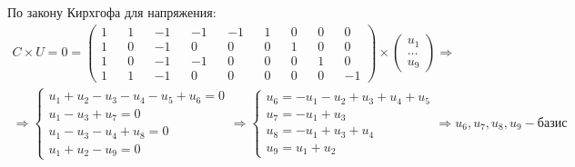 \documentclass{article}
\begin{document}
По закону Кирхгофа для напряжения:
\begin{align*}
    C \times U = 0 = 
    \begin{pmatrix}
        1 && 1 && -1 && -1 && -1 && 1 && 0 && 0 &&  0 \\
        1 && 0 && -1 &&  0 &&  0 && 0 && 1 && 0 &&  0 \\
        1 && 0 && -1 && -1 &&  0 && 0 && 0 && 1 &&  0 \\
        1 && 1 && -1 &&  0 &&  0 && 0 && 0 && 0 && -1
    \end{pmatrix}
    \times
    \begin{pmatrix}
        u_1 \\ \dots \\ u_9
    \end{pmatrix}
    \Longrightarrow \\
    \Longrightarrow
    \begin{cases}
        u_1 + u_2 - u_3 - u_4 - u_5 + u_6 = 0 \\
        u_1 - u_3 + u_7 = 0 \\
        u_1 - u_3 - u_4 + u_8 = 0 \\
        u_1 + u_2 - u_9 = 0
    \end{cases}
    \Longrightarrow
    \begin{cases}
        u_6 = -u_1 - u_2 + u_3 + u_4 + u_5 \\
        u_7 = -u_1 + u_3 \\
        u_8 = -u_1 + u_3 + u_4 \\
        u_9 = u_1 + u_2
    \end{cases}
    \Longrightarrow
    u_6, u_7, u_8, u_9 - \text{базис} \\
\end{align*}
\end{document}
